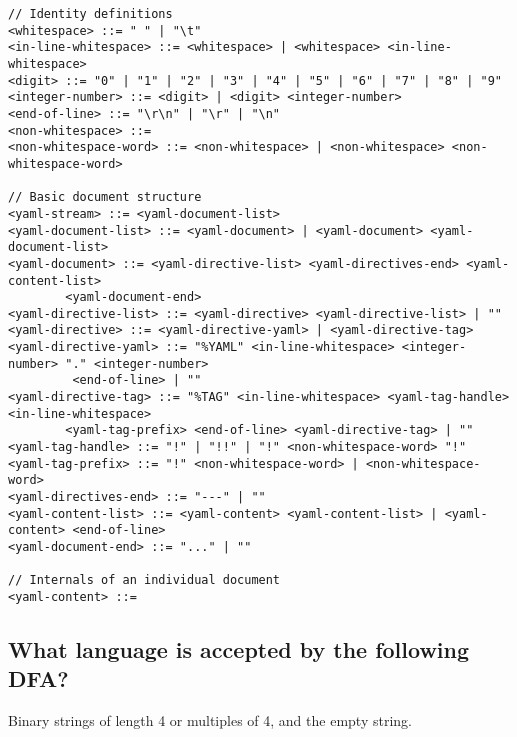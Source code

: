 \documentclass[a4paper]{exam}
\begin{document}
\begin{verbatim}
// Identity definitions
<whitespace> ::= " " | "\t"
<in-line-whitespace> ::= <whitespace> | <whitespace> <in-line-whitespace>
<digit> ::= "0" | "1" | "2" | "3" | "4" | "5" | "6" | "7" | "8" | "9"
<integer-number> ::= <digit> | <digit> <integer-number>
<end-of-line> ::= "\r\n" | "\r" | "\n"
<non-whitespace> ::=
<non-whitespace-word> ::= <non-whitespace> | <non-whitespace> <non-whitespace-word>

// Basic document structure
<yaml-stream> ::= <yaml-document-list>
<yaml-document-list> ::= <yaml-document> | <yaml-document> <yaml-document-list>
<yaml-document> ::= <yaml-directive-list> <yaml-directives-end> <yaml-content-list>
        <yaml-document-end>
<yaml-directive-list> ::= <yaml-directive> <yaml-directive-list> | ""
<yaml-directive> ::= <yaml-directive-yaml> | <yaml-directive-tag>
<yaml-directive-yaml> ::= "%YAML" <in-line-whitespace> <integer-number> "." <integer-number>
         <end-of-line> | ""
<yaml-directive-tag> ::= "%TAG" <in-line-whitespace> <yaml-tag-handle> <in-line-whitespace> 
        <yaml-tag-prefix> <end-of-line> <yaml-directive-tag> | ""
<yaml-tag-handle> ::= "!" | "!!" | "!" <non-whitespace-word> "!"
<yaml-tag-prefix> ::= "!" <non-whitespace-word> | <non-whitespace-word>
<yaml-directives-end> ::= "---" | ""
<yaml-content-list> ::= <yaml-content> <yaml-content-list> | <yaml-content> <end-of-line>
<yaml-document-end> ::= "..." | ""

// Internals of an individual document
<yaml-content> ::=
    \end{verbatim}

\subsection{What language is accepted by the following DFA?}
\begin{solution}
    Binary strings of length 4 or multiples of 4, and the empty string.
\end{solution}
\end{document}
